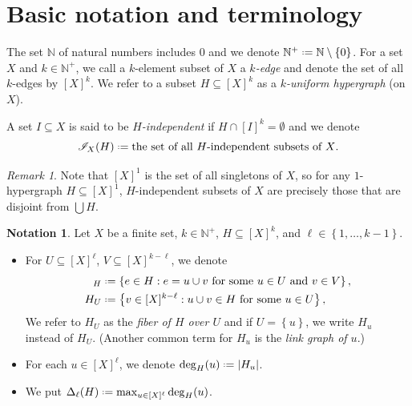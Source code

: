\documentclass[12pt,reqno]{amsart}
\theoremstyle{plain}
\theoremstyle{definition}
\newtheorem{notation}[equation]{Notation}
\theoremstyle{remark}
\newtheorem{remark}[equation]{Remark}
\newcommand{\0}{\mathbb{\emptyset}}
\newcommand{\N}{\mathbb{N}}
\newcommand{\onum}[2][th]{$#2^\text{#1}$}
\newcommand{\set}[1]{\left\{ #1 \right\}}
\newcommand*{\defeq}{\mathrel{\vcenter{\baselineskip0.5ex \lineskiplimit0pt \hbox{\scriptsize.}\hbox{\scriptsize.}}}=}
\newcommand{\De}{\Delta}
\newcommand{\IC}{\mathcal{I}}
\begin{document}
\section{Basic notation and terminology}\label{sec:terms}

\noindent The set $\N$ of natural numbers includes $0$ and we denote $\N^+ \defeq \N \setminus \set{0}$. For a set $X$ and $k \in \N^+$, we call a $k$-element subset of $X$ a \emph{$k$-edge} and denote the set of all $k$-edges by $[X]^k$. We refer to a subset $H \subseteq [X]^k$ as a \emph{$k$-uniform hypergraph} (on $X$).

A set $I \subseteq X$ is said to be \emph{$H$-independent} if $H \cap [I]^k = \0$ and we denote
\[
\IC_X(H) \defeq \text{the set of all $H$-independent subsets of $X$}.
\]

\begin{remark}\label{indep_for_1-hypergraphs}
	Note that $[X]^1$ is the set of all singletons of $X$, so for any $1$-hypergraph $H \subseteq [X]^1$, $H$-independent subsets of $X$ are precisely those that are disjoint from $\bigcup H$.
\end{remark}

\begin{notation}\label{notation:hypergraphs:basic}
	Let $X$ be a finite set, $k \in \N^+$, $H \subseteq [X]^k$, and $\ell \in \set{1, \hdots, k-1}$.
	
	\begin{itemize}
		\item For $U \subseteq [X]^\ell$, $V \subseteq [X]^{k - \ell}$, we denote
		\begin{align*}
		[U,V]_H &\defeq \set{e \in H : e = u \cup v \text{ for some } u \in U \text{ and } v \in V},
		\\
		H_U &\defeq \set{v \in [X]^{k-\ell} : u \cup v \in H \text{ for some } u \in U},
		\end{align*}
		We refer to $H_U$ as the \emph{fiber of $H$ over $U$} and if $U = \set{u}$, we write $H_u$ instead of $H_U$. (Another common term for $H_u$ is the \emph{link graph of $u$}.)
		
		\item For each $u \in [X]^\ell$, we denote $\deg_H(u) \defeq |H_u|$.%
		
		\item We put $\De_\ell(H) \defeq \max_{u \in [X]^\ell} \deg_H(u)$.%
	\end{itemize}
\end{notation}
\end{document}
